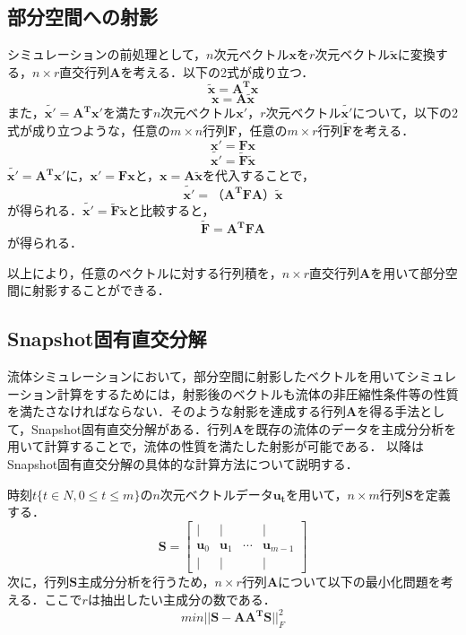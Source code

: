 \documentclass[a4j,12pt]{jreport}
\begin{document}
\subsection{部分空間への射影}
シミュレーションの前処理として，$n$次元ベクトル$\bm{x}$を$r$次元ベクトル$\bm{\tilde{x}} $に変換する，$n \times r$直交行列$\mathbf{A}$を考える．以下の2式が成り立つ．
 	\[
 		\bm{\tilde{x}}  = \mathbf{A^T}\bm{x}
 	\]
	\[
		\bm{x} = \mathbf{A}\bm{\tilde{x}} 
	\]	
	また，$\bm{\tilde{x'}}  = \mathbf{A^T}\bm{x'}$を満たす$n$次元ベクトル$\bm{x'}$，$r$次元ベクトル$\bm{\tilde{x'}} $について，以下の2式が成り立つような，任意の$m \times n$行列$\mathbf{F}$，任意の$m \times r$行列$\mathbf{\tilde{F}}$を考える．
	\[
		\bm{x'} = \mathbf{F}\bm{x}
	\]
	\[
		\bm{\tilde{x'}}  = \mathbf{\tilde{F}}\bm{\tilde{x}} 
	\]
$\bm{\tilde{x'}}  = \mathbf{A^T}\bm{x'}$に，$\bm{x'} = \mathbf{F}\bm{x}$と，$\bm{x} = \mathbf{A}\bm{\tilde{x}} $を代入することで，
	\[
		\bm{\tilde{x'}}  = （\mathbf{A^T}\mathbf{F}\mathbf{A}）\bm{\tilde{x}} 
	\]
	が得られる．$\bm{\tilde{x'}}  = \mathbf{\tilde{F}}\bm{\tilde{x}} $と比較すると，
	\[
	\mathbf{\tilde{F}} = \mathbf{A^T}\mathbf{F}\mathbf{A}
	\]
	が得られる．
	
以上により，任意のベクトルに対する行列積を，$n \times r$直交行列$\mathbf{A}$を用いて部分空間に射影することができる．

\subsection{Snapshot固有直交分解}
流体シミュレーションにおいて，部分空間に射影したベクトルを用いてシミュレーション計算をするためには，射影後のベクトルも流体の非圧縮性条件等の性質を満たさなければならない．そのような射影を達成する行列$\mathbf{A}$を得る手法として，Snapshot固有直交分解がある．行列$\mathbf{A}$を既存の流体のデータを主成分分析を用いて計算することで，流体の性質を満たした射影が可能である．
以降はSnapshot固有直交分解の具体的な計算方法について説明する．
	
	時刻$t \{t \in N, 0 \le t \le m\}$の$n$次元ベクトルデータ$\bm{u_t}$を用いて，$n\times m$行列$\mathbf{S}$を定義する．
		 \[ \mathbf{S} = 
        		\begin{bmatrix}
   | & | &  & |\\
   \bm{u}_0 & \bm{u}_1 &\cdots  & \bm{u}_{m-1} \\
   | & | &  & |
\end{bmatrix}
\]
次に，行列$\mathbf{S}$主成分分析を行うため，$n \times r$行列$\mathbf{A}$について以下の最小化問題を考える．ここで$r$は抽出したい主成分の数である．
\[
min || \mathbf{S} -  \mathbf{A}\mathbf{A^T} \mathbf{S}||^2_F
\]
\end{document}
